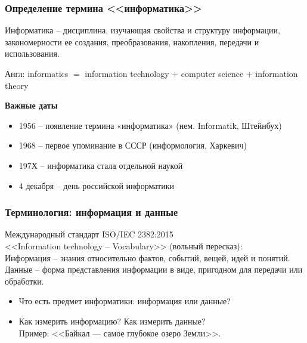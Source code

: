 \documentclass[10pt]{beamer}
\begin{document}
	
	\begin{frame}
		\frametitle{Определение термина <<информатика>>}
		Информатика – дисциплина, изучающая свойства и структуру информации, закономерности ее создания, преобразования, накопления, передачи и использования.

		Англ: informatics $=$ information technology $+$ computer science $+$ information theory

		\begin{center}
			\textbf{Важные даты}
		\end{center}
		\begin{itemize}
			\item 1956 – появление термина «информатика» (нем. Informatik, Штейнбух)
			\item 1968 – первое упоминание в СССР (информология, Харкевич)
			\item 197Х – информатика стала отдельной наукой
			\item 4 декабря – день российской информатики
		\end{itemize}
	\end{frame}
  
	\begin{frame}
		\frametitle{Терминология: информация и данные}
		Международный стандарт ISO/IEC 2382:2015 \\
		<<Information technology – Vocabulary>> (вольный пересказ):\\
		\hskip 20pt Информация – знания относительно фактов, событий, вещей, идей и понятий. \\
		\hskip 20pt Данные – форма представления информации в виде, пригодном для передачи или обработки.

		\begin{itemize}
			\item Что есть предмет информатики: информация или данные?
			\item Как измерить информацию? Как измерить данные? \\
				Пример: <<Байкал — самое глубокое озеро Земли>>.
		\end{itemize}
    	\end{frame}
  
\end{document}

